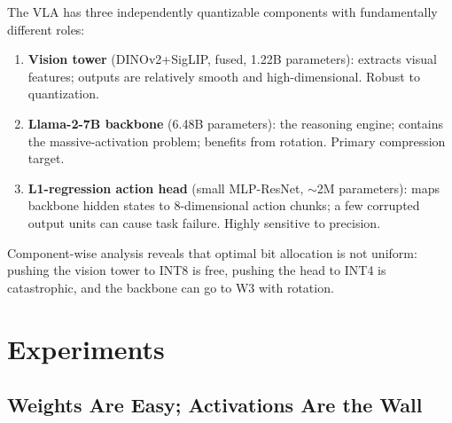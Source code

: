 \documentclass[conference]{IEEEtran}
\begin{document}
The VLA has three independently quantizable components with fundamentally different roles:
\begin{enumerate}
  \item \textbf{Vision tower} (DINOv2+SigLIP, fused, 1.22B parameters): extracts visual
        features; outputs are relatively smooth and high-dimensional. Robust to quantization.
  \item \textbf{Llama-2-7B backbone} (6.48B parameters): the reasoning engine; contains
        the massive-activation problem; benefits from rotation. Primary compression target.
  \item \textbf{L1-regression action head} (small MLP-ResNet, $\sim$2M parameters):
        maps backbone hidden states to 8-dimensional action chunks; a few corrupted output
        units can cause task failure. Highly sensitive to precision.
\end{enumerate}

Component-wise analysis reveals that optimal bit allocation is not uniform: pushing the
vision tower to INT8 is free, pushing the head to INT4 is catastrophic, and the backbone can
go to W3 with rotation.

\section{Experiments}
\label{sec:experiments}

\subsection{Weights Are Easy; Activations Are the Wall}
\label{sec:wall}
\end{document}
